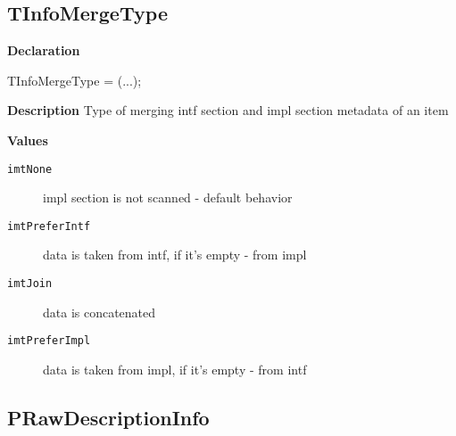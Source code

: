 \documentclass{report}
\newif\ifpdf
\begin{document}
\subsection*{TInfoMergeType}
\fi
\label{PasDoc_Items-TInfoMergeType}
\begin{list}{}{
\setlength{\itemindent}{0cm}
\setlength{\listparindent}{0cm}
\setlength{\leftmargin}{\evensidemargin}
\addtolength{\leftmargin}{\tmplength}
\settowidth{\labelsep}{X}
\addtolength{\leftmargin}{\labelsep}
\setlength{\labelwidth}{\tmplength}
}
\item[\textbf{Declaration}\hfill]
\ifpdf
\begin{flushleft}
\fi
\begin{ttfamily}
TInfoMergeType = (...);\end{ttfamily}

\ifpdf
\end{flushleft}
\fi

\par
\item[\textbf{Description}]
Type of merging intf section and impl section metadata of an item\item[\textbf{Values}]
\begin{description}
\item[\texttt{imtNone}] \label{PasDoc_Items-imtNone}
\index{}
impl section is not scanned {-} default behavior
\item[\texttt{imtPreferIntf}] \label{PasDoc_Items-imtPreferIntf}
\index{}
data is taken from intf, if it's empty {-} from impl
\item[\texttt{imtJoin}] \label{PasDoc_Items-imtJoin}
\index{}
data is concatenated
\item[\texttt{imtPreferImpl}] \label{PasDoc_Items-imtPreferImpl}
\index{}
data is taken from impl, if it's empty {-} from intf
\end{description}


\end{list}
\ifpdf
\subsection*{\large{\textbf{PRawDescriptionInfo}}\normalsize\hspace{1ex}\hrulefill}
\else
\end{document}
